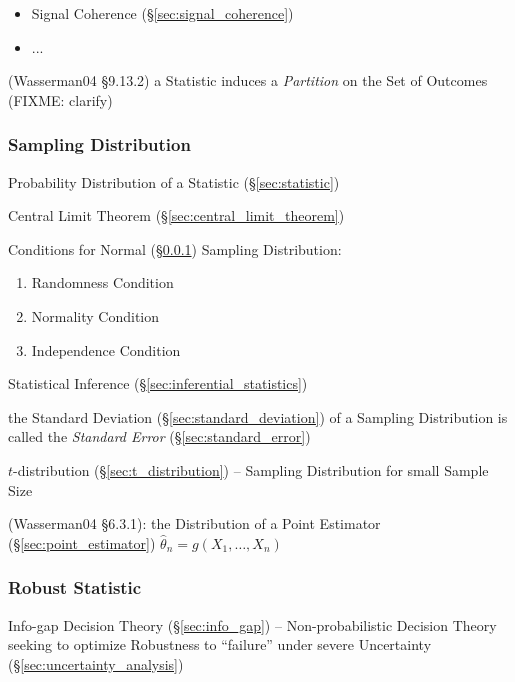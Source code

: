\asterism

\begin{itemize}
  \item Signal Coherence (\S\ref{sec:signal_coherence})
  \item ...
\end{itemize}

\asterism

(Wasserman04 \S9.13.2) a Statistic induces a \emph{Partition} on the Set of
Outcomes (FIXME: clarify)



\subsubsection{Sampling Distribution}\label{sec:sampling_distribution}

Probability Distribution of a Statistic (\S\ref{sec:statistic})

\fist Central Limit Theorem (\S\ref{sec:central_limit_theorem})

Conditions for Normal (\S\ref{sec:sampling_distribution}) Sampling Distribution:
\begin{enumerate}
  \item Randomness Condition
  \item Normality Condition
  \item Independence Condition
\end{enumerate}

Statistical Inference (\S\ref{sec:inferential_statistics})

the Standard Deviation (\S\ref{sec:standard_deviation}) of a Sampling
Distribution is called the \emph{Standard Error} (\S\ref{sec:standard_error})

$t$-distribution (\S\ref{sec:t_distribution}) -- Sampling Distribution for small
Sample Size

(Wasserman04 \S6.3.1):
the Distribution of a Point Estimator (\S\ref{sec:point_estimator})
$\hat{\theta}_n = g(X_1,\ldots,X_n)$



\subsubsection{Robust Statistic}\label{sec:robust_statistic}

\fist Info-gap Decision Theory (\S\ref{sec:info_gap}) -- Non-probabilistic
Decision Theory seeking to optimize Robustness to ``failure'' under severe
Uncertainty (\S\ref{sec:uncertainty_analysis})



